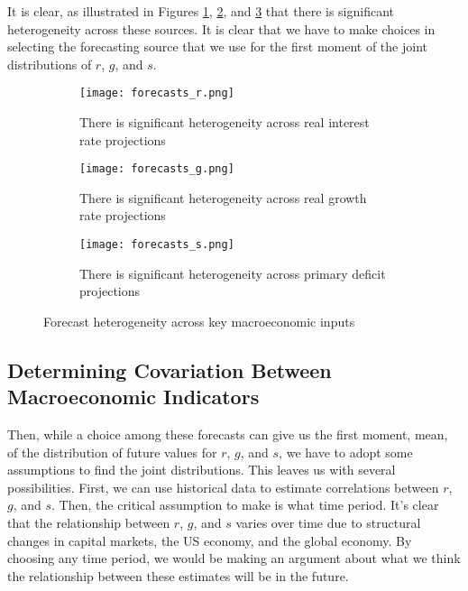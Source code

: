\documentclass{article}
\begin{document}
It is clear, as illustrated in Figures \ref{fig:forecasts_r}, \ref{fig:forecasts_g}, and \ref{fig:forecasts_s} that there is significant heterogeneity across these sources. It is clear that we have to make choices in selecting the forecasting source that we use for the first moment of the joint distributions of $r$, $g$, and $s$. 

\begin{figure}[htbp!]
\centering

\begin{subfigure}[b]{0.60\textwidth}
    \centering
    \texttt{[image: forecasts\_r.png]}
    \caption{There is significant heterogeneity across real interest rate projections}
    \label{fig:forecasts_r}
\end{subfigure}

\vspace{1em}  %

\begin{subfigure}[b]{0.60\textwidth}
    \centering
    \texttt{[image: forecasts\_g.png]}
    \caption{There is significant heterogeneity across real growth rate projections}
    \label{fig:forecasts_g}
\end{subfigure}

\vspace{1em}

\begin{subfigure}[b]{0.60\textwidth}
    \centering
    \texttt{[image: forecasts\_s.png]}
    \caption{There is significant heterogeneity across primary deficit projections}
    \label{fig:forecasts_s}
\end{subfigure}

\caption{Forecast heterogeneity across key macroeconomic inputs}
\label{fig:forecasts_all}
\end{figure}

\subsection{Determining Covariation Between Macroeconomic Indicators}

Then, while a choice among these forecasts can give us the first moment, mean, of the distribution of future values for $r$, $g$, and $s$, we have to adopt some assumptions to find the joint distributions. This leaves us with several possibilities. First, we can use historical data to estimate correlations between $r$, $g$, and $s$. Then, the critical assumption to make is what time period. It's clear that the relationship between $r$, $g$, and $s$ varies over time due to structural changes in capital markets, the US economy, and the global economy. By choosing any time period, we would be making an argument about what we think the relationship between these estimates will be in the future. 
\end{document}
